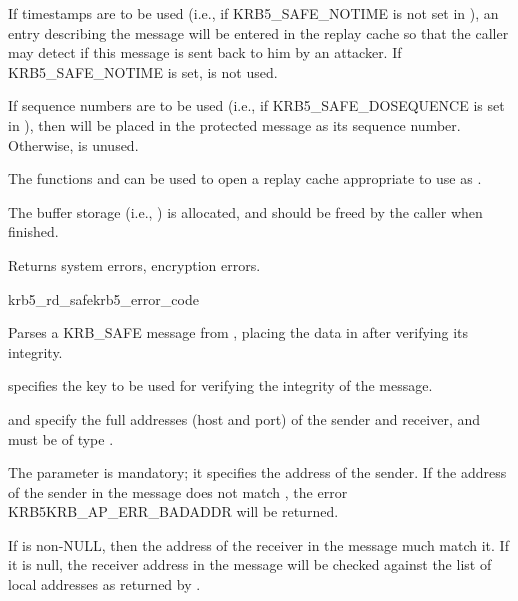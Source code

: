 If timestamps are to be used (i.e., if KRB5_SAFE_NOTIME is not set in
), an entry
describing the message will be entered in the replay cache
 so that the caller may detect if this message is sent
back to him by an attacker.  If KRB5_SAFE_NOTIME is set,
 is not used.

If sequence numbers are to be used (i.e., if KRB5_SAFE_DOSEQUENCE is
set in ), then  will be
placed in the protected message as its sequence number.  Otherwise,
 is unused.

The functions  and
 can be used to open a replay cache
appropriate to use as .

The  buffer storage (i.e.,
) is allocated, and should be freed by
the caller when finished.

Returns system errors, encryption errors.

\begin{funcdecl}{krb5_rd_safe}{krb5_error_code}{\funcin}
\funcinout
{}
\funcout
{}
\end{funcdecl}

Parses a KRB_SAFE message from , placing the
data in  after verifying its integrity.

 specifies the key to be used for verifying the
integrity of the message.
 
 and  specify the full
addresses (host and port) of the sender and receiver, and must be of
type .  

The  parameter is mandatory; it
specifies the address of the sender.  If the address of the sender in
the message does not match , the error
KRB5KRB_AP_ERR_BADADDR will be returned.

If  is non-NULL, then the address of the receiver
in the message much match it.  If it is null, the receiver address in
the message will be checked against the list of local addresses as
returned by .

